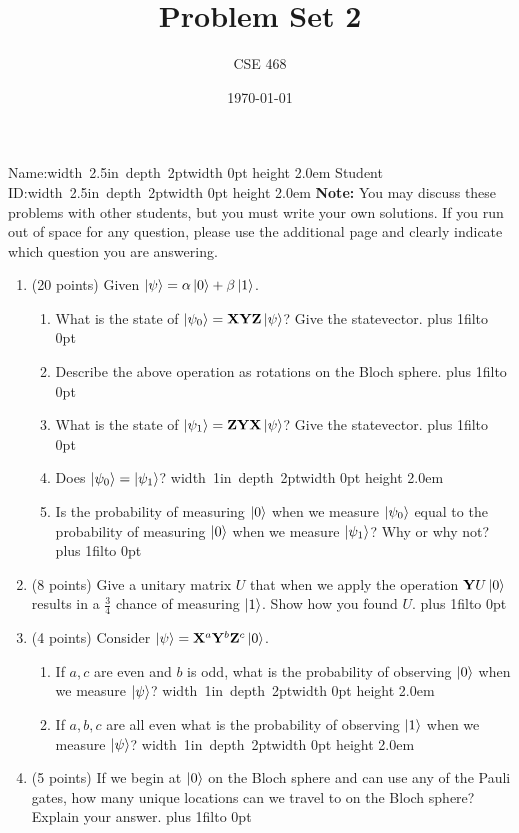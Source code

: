 \documentclass[12pt]{article}
\title{Problem Set 2}
\author{CSE 468}
\date{\today}
\newcommand{\Blank}{\mbox{\hskip 4pt\vrule width 1in depth 2pt}\vrule width 0pt height 2.0em}
\newcommand{\NameBlank}{\mbox{\hskip 4pt\vrule width 2.5in depth 2pt}\vrule width 0pt height 2.0em}
\def\DefaultSpace{1in}
\newcommand{\LeaveSpace}[1][\DefaultSpace]{%
\vskip #1 plus 1fil\relax\hbox to 0pt{\hss} %
}
\begin{document}
\maketitle

\noindent Name:\NameBlank{} \newline
\noindent Student ID:\NameBlank{} \newline
\textbf{Note:} You may discuss these problems with other students, but you must write your own solutions. If you run out of space for any question, please use the additional page and clearly indicate which question you are answering.
\begin{enumerate}[font=\bfseries]
    \item (20 points) Given $\ket{\psi} = \alpha\ket{0} + \beta\ket{1}$.
    \begin{enumerate}
        \item What is the state of $\ket{\psi_0} = \mathbf{X}\mathbf{Y}\mathbf{Z}\ket{\psi}$? Give the statevector. \LeaveSpace[0.4in]
        \item Describe the above operation as rotations on the Bloch sphere.\LeaveSpace{}
        \item What is the state of $\ket{\psi_1} = \mathbf{Z}\mathbf{Y}\mathbf{X}\ket{\psi}$? Give the statevector. \LeaveSpace[0.4in]
        \item Does $\ket{\psi_0} = \ket{\psi_1}$? \Blank{}
        \item Is the probability of measuring $\ket{0}$ when we measure $\ket{\psi_0}$ equal to the probability of measuring $\ket{0}$ when we measure $\ket{\psi_1}$? Why or why not?\LeaveSpace{}
    \end{enumerate}
    \item (8 points) Give a unitary matrix $U$ that when we apply the operation $\mathbf{Y}U\ket{0}$ results in a $\frac{3}{4}$ chance of measuring $\ket{1}$. Show how you found $U$. \LeaveSpace[2.0in]
    \item (4 points) Consider $\ket{\psi} = \mathbf{X}^a\mathbf{Y}^b\mathbf{Z}^c\ket{0}$.
    \begin{enumerate}
        \item If $a,c$ are even and $b$ is odd, what is the probability of observing $\ket{0}$ when we measure $\ket{\psi}$? \Blank{}
        \item If $a,b,c$ are all even what is the probability of observing $\ket{1}$ when we measure $\ket{\psi}$? \Blank{}
    \end{enumerate}
    \item (5 points) If we begin at $\ket{0}$ on the Bloch sphere and can use any of the Pauli gates, how many unique locations can we travel to on the Bloch sphere? Explain your answer. \LeaveSpace{}

\end{enumerate}
\end{document}
